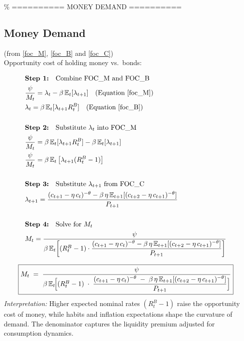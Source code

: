 \documentclass[11pt,preprint]{elsarticle}
\numberwithin{equation}{section}
\numberwithin{figure}{section}
\numberwithin{table}{section}
\begin{document}
\% ========== MONEY DEMAND ==========

\subsection*{Money Demand}

(from \eqref{foc_M}, \eqref{foc_B} and \eqref{foc_C})\\
Opportunity cost of holding money vs.~bonds:

\begin{align*}
& \textbf{Step 1:} \quad \text{Combine FOC\_M and FOC\_B} \\
& \frac{\psi}{M_t} = \lambda_t - \beta\,\mathbb{E}_t[\lambda_{t+1}] \quad \text{(Equation \ref{foc_M})} \\
& \lambda_t = \beta\,\mathbb{E}_t[\lambda_{t+1}R_t^B] \quad \text{(Equation \ref{foc_B})} \\
& \\
& \textbf{Step 2:} \quad \text{Substitute } \lambda_t \text{ into FOC\_M} \\
& \frac{\psi}{M_t} = \beta\,\mathbb{E}_t[\lambda_{t+1}R_t^B] - \beta\,\mathbb{E}_t[\lambda_{t+1}] \\
& \frac{\psi}{M_t} = \beta\,\mathbb{E}_t\left[\lambda_{t+1}(R_t^B - 1)\right] \\
& \\
& \textbf{Step 3:} \quad \text{Substitute } \lambda_{t+1} \text{ from FOC\_C} \\
& \lambda_{t+1} = \frac{(c_{t+1} - \eta\,c_t)^{-\theta} - \beta\,\eta\,\mathbb{E}_{t+1}[(c_{t+2} - \eta\,c_{t+1})^{-\theta}]}{P_{t+1}} \\
& \\
& \textbf{Step 4:} \quad \text{Solve for } M_t \\
& M_t = \frac{\psi}{\beta\,\mathbb{E}_t\!\left[ (R_t^B - 1) \cdot \dfrac{(c_{t+1} - \eta\,c_t)^{-\theta} - \beta\,\eta\,\mathbb{E}_{t+1}[(c_{t+2} - \eta\,c_{t+1})^{-\theta}]}{P_{t+1}} \right]}
\end{align*}

\[
\boxed{
  M_t
  \;=\;
  \frac{\psi}
       {\beta\,\mathbb{E}_t\!\Bigl[
         (R_t^B - 1)
         \;\cdot\;
         \dfrac{(c_{t+1} - \eta\,c_t)^{-\theta}
               \;-\;
               \beta\,\eta\,\mathbb{E}_{t+1}[(c_{t+2} - \eta\,c_{t+1})^{-\theta}]}
              {P_{t+1}}
       \Bigr]}
}
\] \textit{Interpretation:} Higher expected nominal rates
\((R_t^B - 1)\) raise the opportunity cost of money, while habits and
inflation expectations shape the curvature of demand. The denominator
captures the liquidity premium adjusted for consumption dynamics.
\end{document}
